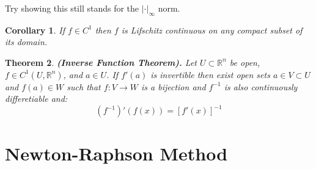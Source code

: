\documentclass[11pt,a4paper]{article}
\theoremstyle{definition}
\theoremstyle{plain}
\newtheorem{theorem}{Theorem}[section]
\newtheorem{corollary}[theorem]{Corollary}
\newcommand{\R}{\mathbb{R}}
\begin{document}
	\noindent Try showing this still stands for the $|\cdot|_\infty$ norm.
	\begin{corollary}
		If $f \in C^1$ then $f$ is Lifschitz continuous on any compact
		subset of its domain.
	\end{corollary}
	\begin{theorem}
	\textnormal{\textbf{(Inverse Function Theorem).}}
	Let $U \subset \R^n$ be open,
	$f \in C^1(U,\R^n)$, and $a \in U$. If $f'(a)$ is invertible then
	exist open sets $a \in V \subset U$ and $f(a) \in W$ such that
	$f \colon V \to W$ is a bijection and $f^{-1}$ is also continuously 
	differetiable and:
	\[
		(f^{-1})'(f(x)) = [f'(x)]^{-1}
	\]
	\end{theorem}
	
	
	\newpage
	
	\section{Newton-Raphson Method}
	
	\newpage
	
\end{document}
